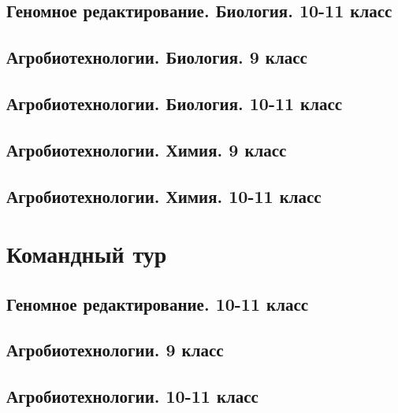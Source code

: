 \documentclass[a4paper,12pt,oneside]{book}
\begin{document}
\section{Геномное редактирование. Биология. 10-11 класс}


\section{Агробиотехнологии. Биология. 9 класс}


\section{Агробиотехнологии. Биология. 10-11 класс}


\section{Агробиотехнологии. Химия. 9 класс}


\section{Агробиотехнологии. Химия. 10-11 класс}



\chapter{Командный тур}
\section{Геномное редактирование. 10-11 класс}


\section{Агробиотехнологии. 9 класс} 



\section{Агробиотехнологии. 10-11 класс}





\clearpage
\text{ }
\end{document}
